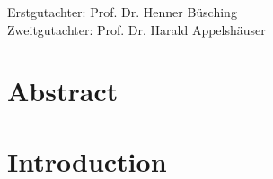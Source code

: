 \documentclass[12pt,a4paper]{report}
\begin{document}
\vspace*{22cm}
\large{Erstgutachter: Prof. Dr. Henner Büsching}\\
\large{Zweitgutachter: Prof. Dr. Harald Appelshäuser}
\normalsize
{}
\newpage
\tableofcontents
\newpage

\setcounter{chapter}{-1}
\chapter{Abstract}

\chapter{Introduction}
\label{cha:StdModel}
\end{document}
